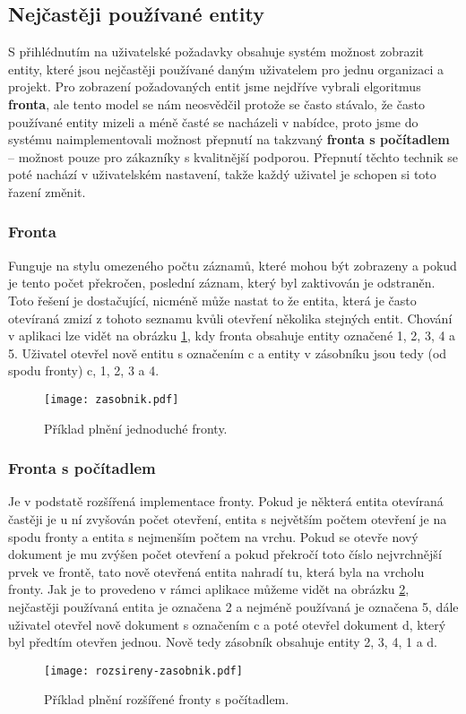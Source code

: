 \subsection{Nejčastěji používané entity}
\par S přihlédnutím na uživatelské požadavky obsahuje systém možnost zobrazit entity, které jsou nejčastěji používané daným uživatelem pro jednu organizaci a projekt. Pro zobrazení požadovaných entit jsme nejdříve vybrali elgoritmus \textbf{fronta}, ale tento model se nám neosvědčil protože se často stávalo, že často používané entity mizeli a méně časté se nacházeli v nabídce, proto jsme do systému naimplementovali možnost přepnutí na takzvaný \textbf{fronta s počítadlem} -- možnost pouze pro zákazníky s kvalitnější podporou. Přepnutí těchto technik se poté nachází v uživatelském nastavení, takže každý uživatel je schopen si toto řazení změnit.

\subsubsection{Fronta}
\par Funguje na stylu omezeného počtu záznamů, které mohou být zobrazeny a pokud je tento počet překročen, poslední záznam, který byl zaktivován je odstraněn. Toto řešení je dostačující, nicméně může nastat to že entita, která je často otevíraná zmizí z tohoto seznamu kvůli otevření několika stejných entit. Chování v aplikaci lze vidět na obrázku \ref{zasobnik}, kdy fronta obsahuje entity označené 1, 2, 3, 4 a 5. Uživatel otevřel nově entitu s označením c a entity v zásobníku jsou tedy (od spodu fronty) c, 1, 2, 3 a 4.
\begin{figure}[htp]
  \centering
  \texttt{[image: zasobnik.pdf]}
  \caption{Příklad plnění jednoduché fronty.}
  \label{zasobnik}
\end{figure}

\subsubsection{Fronta s počítadlem}
\par Je v podstatě rozšířená implementace fronty. Pokud je některá entita otevíraná častěji je u ní zvyšován počet otevření, entita s největším počtem otevření je na spodu fronty a entita s nejmenším počtem na vrchu. Pokud se otevře nový dokument je mu zvýšen počet otevření a pokud překročí toto číslo nejvrchnější prvek ve frontě, tato nově otevřená entita nahradí tu, která byla na vrcholu fronty. Jak je to provedeno v rámci aplikace můžeme vidět na obrázku \ref{counter}, nejčastěji používaná entita je označena 2 a nejméně používaná je označena 5, dále uživatel otevřel nově dokument s označením c a poté otevřel dokument d, který byl předtím otevřen jednou. Nově tedy zásobník obsahuje entity 2, 3, 4, 1 a d.
\begin{figure}[htp]
  \centering
  \texttt{[image: rozsireny-zasobnik.pdf]}
  \caption{Příklad plnění rozšířené fronty s počítadlem.}
  \label{counter}
\end{figure}

